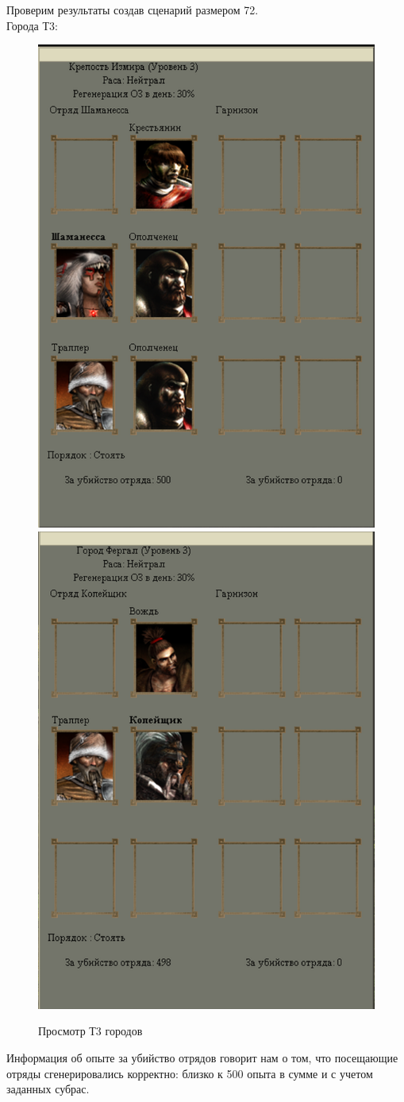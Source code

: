 \begin{figure}[H]

\end{figure}

Проверим результаты создав сценарий размером 72.\\
Города Т3:

\begin{figure}[H]
\begin{center}
\includegraphics[width=.45\linewidth]{docImages/townT3Preview.png}
\includegraphics[width=.45\linewidth]{docImages/townT3Preview2.png}
\caption{Просмотр Т3 городов}
\end{center}
\end{figure}

Информация об опыте за убийство отрядов говорит нам о том, что посещающие отряды сгенерировались корректно: близко к 500 опыта в сумме и с учетом заданных субрас.


